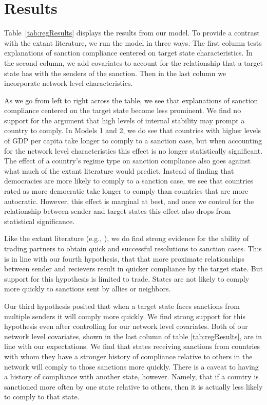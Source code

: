 \section*{Results}
\label{Results} 

Table~\ref{tab:regResults} displays the results from our model. To provide a contrast with the extant literature, we run the model in three ways. The first column tests explanations of sanction compliance centered on target state characteristics. In the second column, we add covariates to account for the relationship that a target state has with the senders of the sanction. Then in the last column we incorporate network level characteristics. 

As we go from left to right across the table, we see that explanations of sanction compliance centered on the target state become less prominent. We find no support for the argument that high levels of internal stability may prompt a country to comply. In Models 1 and 2, we do see that countries with higher levels of GDP per capita take longer to comply to a sanction case, but when accounting for the network level characteristics this effect is no longer statistically significant. The effect of a country's regime type on sanction compliance also goes against what much of the extant literature would predict. Instead of finding that democracies are more likely to comply to a sanction case, we see that countries rated as more democratic take longer to comply than countries that are more autocratic. However, this effect is marginal at best, and once we control for the relationship between sender and target states this effect also drops from statistical significance. 

Like the extant literature (e.g., \citealp{mclean2010friends}), we do find strong evidence for the ability of trading partners to obtain quick and successful resolutions to sanction cases. This is in line with our fourth hypothesis, that that more proximate relationships between sender and recievers result in quicker compliance by the target state. But support for this hypothesis is limited to trade. States are not likely to comply more quickly to sanctions sent by allies or neighbors. 


\FloatBarrier

Our third hypothesis posited that when a target state faces sanctions from multiple senders it will comply more quickly. We find strong support for this hypothesis even after controlling for our network level covariates. Both of our network level covariates, shown in the last column of table \ref{tab:regResults}, are in line with our expectations. We find that states receiving sanctions from countries with whom they have a stronger history of compliance relative to others in the network will comply to those sanctions more quickly. There is a caveat to having a history of compliance with another state, however. Namely, that if a country is sanctioned more often by one state relative to others, then it is actually less likely to comply to that state. 

